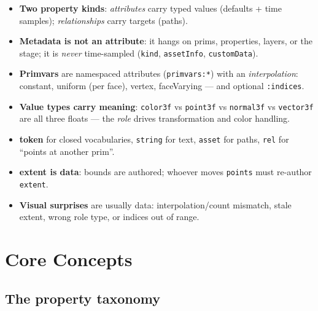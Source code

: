 \CheatSheetTitle
\begin{itemize}[leftmargin=*]
  \item \textbf{Two property kinds}: \emph{attributes} carry typed values
        (defaults + time samples); \emph{relationships} carry targets (paths).
  \item \textbf{Metadata is not an attribute}: it hangs on prims, properties,
        layers, or the stage; it is \emph{never} time-sampled
        (\texttt{kind}, \texttt{assetInfo}, \texttt{customData}).
  \item \textbf{Primvars} are namespaced attributes (\texttt{primvars:*}) with
        an \emph{interpolation}: constant, uniform (per face), vertex,
        faceVarying --- and optional \texttt{:indices}.
  \item \textbf{Value types carry meaning}: \texttt{color3f} vs
        \texttt{point3f} vs \texttt{normal3f} vs \texttt{vector3f} are all
        three floats --- the \emph{role} drives transformation and color
        handling.
  \item \textbf{token} for closed vocabularies, \texttt{string} for text,
        \texttt{asset} for paths, \texttt{rel} for ``points at another prim''.
  \item \textbf{extent is data}: bounds are authored; whoever moves
        \texttt{points} must re-author \texttt{extent}.
  \item \textbf{Visual surprises} are usually data: interpolation/count
        mismatch, stale extent, wrong role type, or indices out of range.
\end{itemize}

\section{Core Concepts}

\subsection{The property taxonomy}\label{sec:dm-tax}

